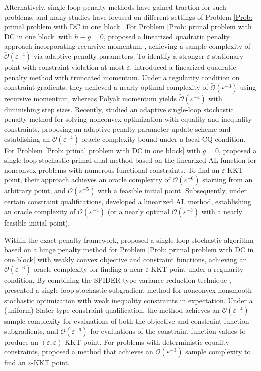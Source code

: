 \documentclass{article}
\theoremstyle{plain}
\theoremstyle{definition}
\theoremstyle{remark}
\newcommand{\calO}{\mathcal{O}}
\numberwithin{equation}{section}
\begin{document}
Alternatively, single-loop penalty methods have gained traction for such problems, and many studies have focused on different settings of Problem \eqref{Prob: primal problem with DC in one block}. For Problem \eqref{Prob: primal problem with DC in one block} with \(h - g = 0\), \citet{Alacaoglu2023ComplexityOS} proposed a linearized quadratic penalty approach incorporating recursive momentum \citep{cutkosky2019momentum}, achieving a sample complexity of $\tilde{\calO}(\varepsilon^{-4})$ via adaptive penalty parameters. To identify a stronger $\varepsilon$-stationary point with constraint violation at most $\varepsilon$, \citet{lu2024variancereducedfirstordermethodsdeterministically} introduced a linearized quadratic penalty method with truncated momentum. Under a regularity condition on constraint gradients, they achieved a nearly optimal complexity of $\tilde{\calO}(\varepsilon^{-3})$ using recursive momentum, whereas Polyak momentum yields $\tilde{\calO}(\varepsilon^{-4})$ with diminishing step sizes. {Recently, \citet{zuo2025adaptive} studied an adaptive single-loop stochastic penalty method for solving nonconvex optimization with equality and inequality constraints, proposing an adaptive penalty parameter update scheme and establishing an $\calO(\varepsilon^{-4})$ oracle complexity bound under a local CQ condition.} For Problem \eqref{Prob: primal problem with DC in one block} with $g = 0$, \citet{jin2022stochastic} proposed a single-loop stochastic primal-dual method based on the linearized AL function for nonconvex problems with numerous functional constraints. To find an $\varepsilon$-KKT point, their approach achieves an oracle complexity of $\calO(\varepsilon^{-6})$ starting from an arbitrary point, and $\calO(\varepsilon^{-5})$ with a feasible initial point. Subsequently, under certain constraint qualifications, \citet{shi2025momentum} developed a linearized AL method, establishing an oracle complexity of $\calO(\varepsilon^{-4})$ (or a nearly optimal $\calO(\varepsilon^{-3})$ with a nearly feasible initial point).

Within the exact penalty framework, \citet{yang2026singleloop} proposed a single-loop stochastic algorithm based on a hinge penalty method for Problem \eqref{Prob: primal problem with DC in one block} with weakly convex objective and constraint functions, achieving an $\calO(\varepsilon^{-6})$ oracle complexity for finding a near-$\varepsilon$-KKT point under a regularity condition. By combining the SPIDER-type variance reduction technique \citep{fang2018spider}, \citet{liu2025single} presented a single-loop stochastic subgradient method for nonconvex nonsmooth stochastic optimization with weak inequality constraints in expectation. Under a (uniform) Slater-type constraint qualification, the method achieves an $\calO(\varepsilon^{-4})$ sample complexity for evaluations of both the objective and constraint function subgradients, and $\calO(\varepsilon^{-6})$ for evaluations of the constraint function values to produce an $(\varepsilon, \varepsilon)$-KKT point. {For problems with deterministic equality constraints, \citet{cui2025exact} proposed a method that achieves an $\calO(\varepsilon^{-3})$ sample complexity to find an $\varepsilon$-KKT point.}
\end{document}

